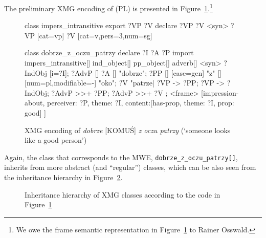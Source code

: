\documentclass[output=paper]{langsci/langscibook}
\begin{document}
The preliminary XMG encoding of (PL)  is presented in Figure~\ref{lic:fig:dobrze:xmg}.\footnote{ We owe the frame semantic representation in Figure~\ref{lic:fig:dobrze:xmg} to Rainer Osswald.}
\begin{figure}[ht]
\begin{xmg}
class impers_intransitive
export ?VP ?V
declare ?VP ?V
{ <syn>{
    ?VP [cat=vp] { ?V [cat=v,pers=3,num=sg] }}}

class dobrze_z_oczu_patrzy
declare ?I ?A ?P
import impers_intransitive[] ind_object[] pp_object[] adverb[] 
{ <syn> {
    ?IndObj [i=?I];
    ?AdvP [] { ?A [] "dobrze"};
    ?PP [] { [case=gen] "z"
      [] { 
        [num=pl,modifiable=-] "oko"}};   
    ?V "patrze|%
    ?VP -> ?PP;
    ?VP -> ?IndObj;
    ?AdvP >>+ ?PP;
    ?AdvP >>+ ?V };
  <frame> {
    [impression-about,
     perceiver: ?P,
     theme: ?I,
     content:[has-prop,
              theme: ?I,
              prop: good]
    ]} 
}
\end{xmg}
  \caption{XMG encoding of \textit{dobrze} [KOMUŚ] \textit{z oczu patrzy} (`someone looks like a good person') }
  \label{lic:fig:dobrze:xmg} 
\end{figure}
Again, the class that corresponds to the MWE, \texttt{dobrze\_z\_oczu\_patrzy[]}, inherits from more abstract (and ``regular'') classes, which can be also seen from the inheritance hierarchy in Figure~\ref{lic:fig:dobrze:xmg:hierarchy}.
\begin{figure}[ht]
  \centering
  \setlength{\tabcolsep}{2mm}
  \caption{Inheritance hierarchy of XMG classes according to the code in Figure~\ref{lic:fig:dobrze:xmg}}
  \label{lic:fig:dobrze:xmg:hierarchy}
\end{figure}
\end{document}
